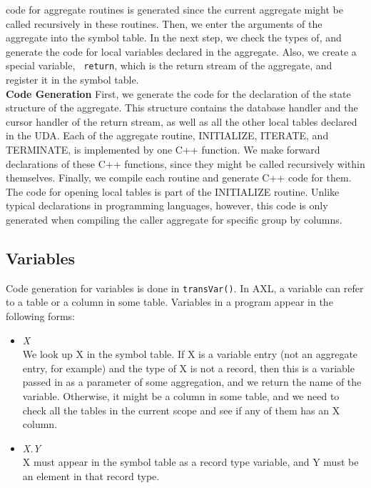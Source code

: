 \begin{itemize}
  code for aggregate routines is generated since the current aggregate
  might be called recursively in these routines. Then, we enter the
  arguments of the aggregate into the symbol table. In the next step,
  we check the types of, and generate the code for local variables
  declared in the aggregate. Also, we create a special variable, {\tt
    return}, which is the return stream of the aggregate, and
  register it in the symbol table. \\
  {\bf Code Generation} First, we generate the code for the
  declaration of the state structure of the aggregate. This structure
  contains the database handler and the cursor handler of the return
  stream, as well as all the other local tables declared in the UDA.
  Each of the aggregate routine, INITIALIZE, ITERATE, and TERMINATE,
  is implemented by one C++ function. We make forward declarations of
  these C++ functions, since they might be called recursively within
  themselves. Finally, we compile each routine and generate C++ code
  for them. The code for opening local tables is part of the
  INITIALIZE routine. Unlike typical declarations in programming
  languages, however, this code is only generated when compiling the
  caller aggregate for specific group by columns.
\end{itemize}

\subsection{Variables}
Code generation for variables is done in {\tt transVar()}. In AXL, a
variable can refer to a table or a column in some table.  Variables in
a program appear in the following forms:

\begin{itemize}
\item {\it X}\\
  We look up X in the symbol table. If X is a variable entry (not an
  aggregate entry, for example) and the type of X is not a record,
  then this is a variable passed in as a parameter of some
  aggregation, and we return the name of the variable. Otherwise, it
  might be a column in some table, and we need to check all the tables
  in the current scope and see if any of them has an X column.
\item {\it X.Y}\\
  X must appear in the symbol table as a record type variable, and Y
  must be an element in that record type.
\end{itemize}

